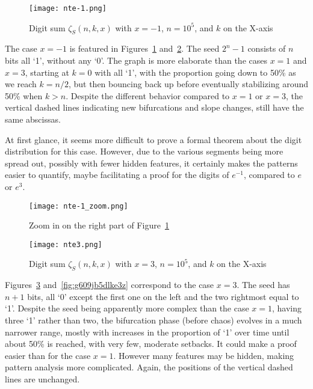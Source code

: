 \documentclass[10pt]{article}
\begin{document}
\begin{figure}[H]
\centering
\texttt{[image: nte-1.png]}
\caption{Digit sum $\zeta_S(n,k,x)$ with $x=-1$, $n=10^5$, and $k$ on the X-axis}
\label{fig:g609jb5dlkem1}
\end{figure}

The case $x=-1$ is featured in Figures~\ref{fig:g609jb5dlkem1} and~\ref{fig:g609jb5dlkem1cx}. The seed $2^n-1$ consists of $n$ bits all `1', without any `0'. The graph is more elaborate than the cases $x=1$ and $x=3$, starting at $k=0$ with all `1', with the proportion going down 
to 50\% as we reach $k = n/2$, but then bouncing back up before eventually stabilizing around 50\% when $k>n$. Despite the different behavior compared to $x=1$ or $x=3$, the vertical dashed lines indicating new bifurcations and slope changes, still have the same abscissas. 

At first glance, it seems more difficult to prove a formal theorem about the digit distribution for this case. However, due to the various segments being more spread out, possibly with fewer hidden features, it certainly makes the patterns easier to quantify, maybe facilitating a proof for the digits of $e^{-1}$, compared to
 $e$ or $e^3$.

\begin{figure}[H]
\centering
\texttt{[image: nte-1\_zoom.png]}
\caption{Zoom in on the right part of Figure~\ref{fig:g609jb5dlkem1}}
\label{fig:g609jb5dlkem1cx}
\end{figure}


\begin{figure}[H]
\centering
\texttt{[image: nte3.png]}
\caption{Digit sum $\zeta_S(n,k,x)$ with $x=3$, $n=10^5$, and $k$ on the X-axis}
\label{fig:g609jb5dlke3}
\end{figure}

Figures~\ref{fig:g609jb5dlke3} and~\ref{fig:g609jb5dlke3z} correspond to the case $x=3$. The seed has $n+1$ bits, all `0' except the first one on the left  and the two rightmost equal to `1'. Despite the seed being apparently more complex than the case $x=1$, having three `1' rather than two, the bifurcation phase (before chaos) evolves in a much narrower range, mostly with increases in the proportion of `1' over time until about 50\% is reached,  with very few, moderate setbacks. It could make a proof easier
 than for the case $x=1$. However many features may be hidden, making pattern analysis more complicated. 
Again, the positions of the vertical dashed lines are unchanged.
\end{document}
